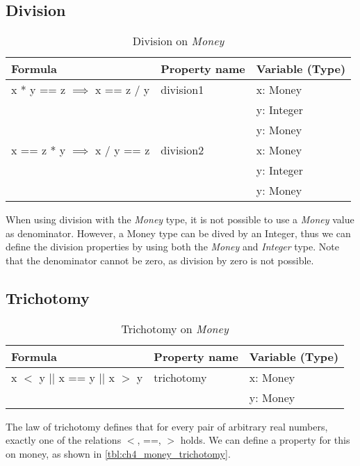 \subsection*{Division}
\begin{table}[h!]
\centering
\begin{tabular}{|lll|}
\hline
                        \textbf{Formula}                 & \textbf{Property name} & \textbf{Variable (Type)} \\ \hline
\rowcolor[HTML]{EFEFEF} x * y == z $\implies$ x == z / y & division1              & x: Money                 \\
\rowcolor[HTML]{EFEFEF}                                  &                        & y: Integer               \\
\rowcolor[HTML]{EFEFEF}                                  &                        & y: Money                 \\
                        x == z * y $\implies$ x / y == z & division2              & x: Money                 \\
                                                         &                        & y: Integer               \\
                                                         &                        & y: Money                 \\ \hline
\end{tabular}
\caption{Division on \textit{Money}}
\label{tbl:ch4_money_division}
\end{table}
When using division with the \textit{Money} type, it is not possible to use a \textit{Money} value as denominator. However, a Money type can be dived by an Integer, thus we can define the division properties by using both the \textit{Money} and \textit{Integer} type. Note that the denominator cannot be zero, as division by zero is not possible. %

\subsection*{Trichotomy}
\begin{table}[h!]
\centering
\begin{tabular}{|lll|}
\hline
                        \textbf{Formula}             & \textbf{Property name} & \textbf{Variable (Type)} \\ \hline
\rowcolor[HTML]{EFEFEF} x $<$ y || x == y || x $>$ y & trichotomy             & x: Money                 \\
\rowcolor[HTML]{EFEFEF}                              &                        & y: Money                 \\ \hline
\end{tabular}
\caption{Trichotomy on \textit{Money}}
\label{tbl:ch4_money_trichotomy}
\end{table}
The law of trichotomy defines that for every pair of arbitrary real numbers, exactly one of the relations $<$, ==, $>$ holds. We can define a property for this on money, as shown in \autoref{tbl:ch4_money_trichotomy}.

